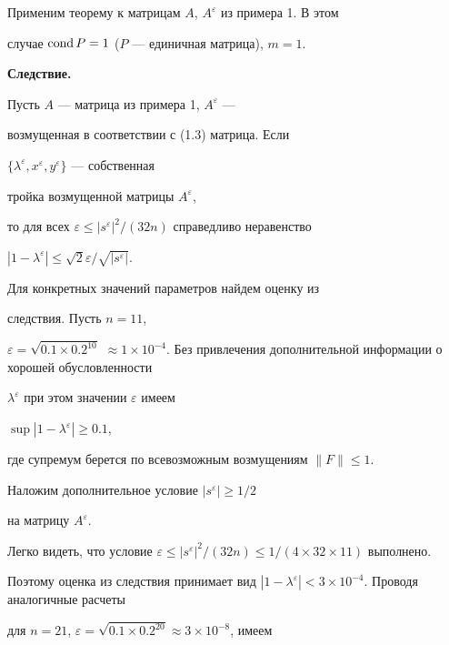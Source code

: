 Применим теорему к матрицам $A$, $A^{\varepsilon}$ из примера 1. В этом


случае $\operatorname{cond} P=1$ ($P$ --- единичная матрица), $m=1$.


\medskip





{\bf Следствие.}


Пусть $A$ --- матрица из примера 1, $ A^{\varepsilon}$ ---


возмущенная в соответствии с (1.3) матрица. Если


$\{\lambda^{\varepsilon}, x^{\varepsilon}, y^{\varepsilon}\}$ --- собственная


тройка возмущенной матрицы $A^{\varepsilon}$,


то для всех $\varepsilon\le |s^{\varepsilon}|^2


/(32 n)$ справедливо неравенство


$|1-\lambda^{\varepsilon}|\le \sqrt{2}\varepsilon/\sqrt{|s^{\varepsilon}|}$.


\medskip





Для конкретных значений параметров найдем оценку из


следствия. Пусть $n=11$,


$\varepsilon=\sqrt{0.1\times 0.2^{10}}$ $\approx 1\times


10^{-4}$. Без привлечения дополнительной информации о хорошей обусловленности


$\lambda^{\varepsilon}$ при этом значении $\varepsilon$ имеем


$\sup|1-\lambda^{\varepsilon}|\ge 0.1$,


где супремум берется по всевозможным возмущениям $\|F\|\le 1$.


Наложим дополнительное условие $|s^{\varepsilon}|\ge 1/2$


на матрицу $A^{\varepsilon}$.


Легко видеть, что условие $\varepsilon\le |s^{\varepsilon}|^2/(32 n)


\le1/(4\times 32 \times 11)$ выполнено.


Поэтому оценка из следствия принимает вид $|1-\lambda^{\varepsilon}|


<3\times 10^{-4}$. Проводя аналогичные расчеты


для $n=21$, $\varepsilon=\sqrt{0.1\times 0.2^{20}}


\approx 3\times 10^{-8}$, имеем


